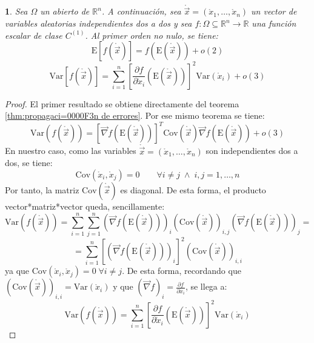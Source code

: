 \documentclass[11pt,a4paper,spanish]{article}
\numberwithin{equation}{section}
\numberwithin{table}{section}
\numberwithin{figure}{section}
\theoremstyle{definition}
\theoremstyle{remark}
\theoremstyle{definition}
\theoremstyle{remark}
\theoremstyle{plain}
\theoremstyle{plain}
\theoremstyle{plain}
\newtheorem{cor}{\protect\corollaryname}[section]
\theoremstyle{plain}
\theoremstyle{plain}
\theoremstyle{plain}
\providecommand{\corollaryname}{Corolario}
\begin{document}
	\begin{cor}
		Sea $\Omega$ un abierto de $\mathbb{R}^{n}$. A continuación, sea
		$\mathring{\vec{x}}=\left(\mathring{x}_{1},\dots,\mathring{x}_{n}\right)$
		un vector de variables aleatorias independientes dos a dos y sea $f:\Omega\subseteq\mathbb{R}^{n}\longrightarrow\mathbb{R}$
		una función escalar de clase $C^{\left(1\right)}$. Al primer orden
		no nulo, se tiene:
		\[
		\mathrm{E}\left[f\left(\mathring{\vec{x}}\right)\right]=f\left(\mathrm{E}\left(\mathring{\vec{x}}\right)\right)+o\left(2\right)
		\]
		\[
		\mathrm{Var}\left[f\left(\mathring{\vec{x}}\right)\right]=\sum_{i=1}^{n}\left[\frac{\partial f}{\partial\dot{x}_{i}}\left(\mathrm{E}\left(\mathring{\vec{x}}\right)\right)\right]^{2}\mathrm{Var}\left(\mathring{x}_{i}\right)+o\left(3\right)
		\]
	\end{cor}
	\begin{proof}
		El primer resultado se obtiene directamente del teorema \vref{thm:propagaci=0000F3n de errores}.
		Por ese mismo teorema se tiene:
		\[
		\mathrm{Var}\left(f\left(\mathring{\vec{x}}\right)\right)=\left[\vec{\nabla}f\left(\mathrm{E}\left(\mathring{\vec{x}}\right)\right)\right]^{T}\mathrm{Cov}\left(\mathring{\vec{x}}\right)\vec{\nabla}f\left(\mathrm{E}\left(\mathring{\vec{x}}\right)\right)+o\left(3\right)
		\]
		En nuestro caso, como las variables $\mathring{\vec{x}}=\left(\mathring{x}_{1},\dots,\mathring{x}_{n}\right)$
		son independientes dos a dos, se tiene:
		\[
		\mathrm{Cov}\left(\mathring{x}_{i},\mathring{x}_{j}\right)=0\qquad\forall i\neq j\;\land\;i,j=1,\dots,n
		\]
		Por tanto, la matriz $\mathrm{Cov}\left(\mathring{\vec{x}}\right)$
		es diagonal. De esta forma, el producto vector{*}matriz{*}vector queda,
		sencillamente:
		\[
		\mathrm{Var}\left(f\left(\mathring{\vec{x}}\right)\right)=\sum_{i=1}^{n}\sum_{j=1}^{n}\left(\vec{\nabla}f\left(\mathrm{E}\left(\mathring{\vec{x}}\right)\right)\right)_{i}\left(\mathrm{Cov}\left(\mathring{\vec{x}}\right)\right)_{i,j}\left(\vec{\nabla}f\left(\mathrm{E}\left(\mathring{\vec{x}}\right)\right)\right)_{j}=
		\]
		\[
		=\sum_{i=1}^{n}\left[\left(\vec{\nabla}f\left(\mathrm{E}\left(\mathring{\vec{x}}\right)\right)\right)_{i}\right]^{2}\left(\mathrm{Cov}\left(\mathring{\vec{x}}\right)\right)_{i,i}
		\]
		ya que $\mathrm{Cov}\left(\mathring{x}_{i},\mathring{x}_{j}\right)=0\;\forall i\neq j$.
		De esta forma, recordando que $\left(\mathrm{Cov}\left(\mathring{\vec{x}}\right)\right)_{i,i}=\mathrm{Var}\left(\mathring{x}_{i}\right)$
		y que $\left(\vec{\nabla}f\right)_{i}=\frac{\partial f}{\partial\dot{x}_{i}}$,
		se llega a:
		\[
		\mathrm{Var}\left(f\left(\mathring{\vec{x}}\right)\right)=\sum_{i=1}^{n}\left[\frac{\partial f}{\partial\dot{x}_{i}}\left(\mathrm{E}\left(\mathring{\vec{x}}\right)\right)\right]^{2}\mathrm{Var}\left(\mathring{x}_{i}\right)
		\]
	\end{proof}
	
\end{document}
